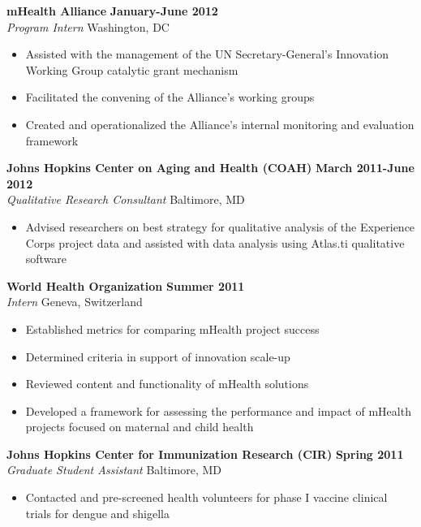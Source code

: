 \documentclass{res}
\begin{document}
\begin{resume}
\textbf{mHealth Alliance} \hfill        \textbf{January-June 2012} \\
\emph{Program Intern}       \hfill   Washington, DC
   \begin{itemize} \itemsep -2pt %
	\item Assisted with the management of the UN Secretary-General’s Innovation Working Group catalytic grant mechanism 
	\item Facilitated the convening of the Alliance’s working groups
	\item Created and operationalized the Alliance’s internal monitoring and evaluation framework
 \end{itemize} \vspace{-4pt}

\textbf{Johns Hopkins Center on Aging and Health (COAH)} \hfill \textbf{March 2011-June 2012} \\
\emph{Qualitative Research Consultant} \hfill Baltimore, MD
 \begin{itemize} \itemsep -2pt
  \item  Advised researchers on best strategy for qualitative analysis of the Experience Corps project data and assisted with data analysis using Atlas.ti qualitative software
\end{itemize} \vspace{-6pt}

\textbf{World Health Organization} \hfill \textbf{Summer 2011} \\
\emph{Intern} \hfill Geneva, Switzerland
 \begin{itemize} \itemsep -2pt
  \item Established metrics for comparing mHealth project success
  \item Determined criteria in support of innovation scale-up
  \item Reviewed content and functionality of mHealth solutions
  \item Developed a framework for assessing the performance and impact of mHealth projects focused on maternal and child health
 \end{itemize} \vspace{-6pt}
 
\textbf{Johns Hopkins Center for Immunization Research (CIR)} \hfill \textbf{Spring 2011} \\
\emph{Graduate Student Assistant} \hfill Baltimore, MD
 \begin{itemize} \itemsep -2pt
  \item Contacted and pre-screened health volunteers for phase I vaccine clinical trials for dengue and shigella
\end{itemize} \vspace{-6pt}


\end{resume}
\end{document}
